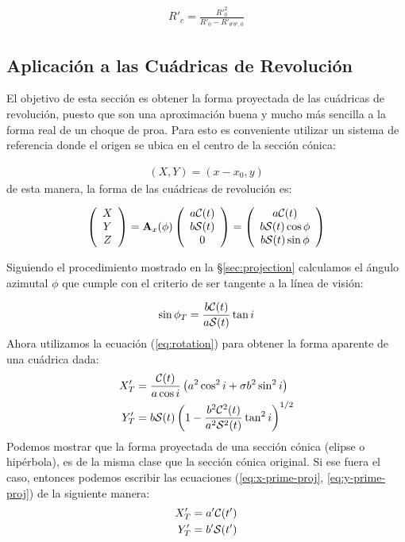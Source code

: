\begin{align}
  R'_c = \frac{R'^2_0}{R'_0 - R'_{\theta'\theta', 0}} \label{eq:Rc-prime}
\end{align}

\subsection{Aplicación a las Cuádricas de Revolución}
\label{sec:pi-lambda-quadric}
El objetivo de esta sección es obtener la forma proyectada de las cuádricas de revolución, puesto que son una aproximación buena y mucho más sencilla a la forma real de un choque de proa. Para esto es conveniente utilizar un sistema de referencia donde el origen se ubica en el centro de la sección cónica:

\begin{align}
  (X, Y) = (x-x_0, y)
\end{align}
de esta manera, la forma de las cuádricas de revolución es:

\begin{align}
  \left(
  \begin{array}{c}
    X \\ Y \\ Z
  \end{array}
  \right) = \mathbf{A}_x(\phi)\left(
  \begin{array}{c}
    a\mathcal{C}(t) \\ b\mathcal{S}(t) \\ 0
  \end{array}
  \right)
  = \left(
    \begin{array}{c}
      a\mathcal{C}(t) \\
      b\mathcal{S}(t)\cos\phi \\
      b\mathcal{S}(t)\sin\phi
    \end{array}
    \right)
\end{align}

Siguiendo el procedimiento mostrado en la \S \ref{sec:projection} calculamos el ángulo azimutal $\phi$ que cumple con el criterio de ser tangente a la línea de visión: 

\begin{align}
  \sin\phi_T = \frac{b\mathcal{C}(t)}{a\mathcal{S}(t)}\tan i 
\end{align}
Ahora utilizamos la ecuación (\ref{eq:rotation}) para obtener la forma aparente de una cuádrica dada:
\begin{align}
  X'_T &= \frac{\mathcal{C}(t)}{a\cos i}\left(a^2\cos^2 i + \sigma b^2\sin^2 i\right)
  \label{eq:x-prime-proj}\\
  Y'_T &= b\mathcal{S}(t)\left(1 - \frac{b^2\mathcal{C}^2(t)}{a^2\mathcal{S}^2(t)}\tan^2 i\right)^{1/2}
  \label{eq:y-prime-proj}
\end{align}
Podemos mostrar que la forma proyectada de una sección cónica (elipse o hipérbola), es de la misma clase que la sección cónica original. Si ese fuera el caso, entonces podemos escribir las ecuaciones (\ref{eq:x-prime-proj}, \ref{eq:y-prime-proj}) de la siguiente manera:
\begin{align}
  X'_T &= a'\mathcal{C}(t') \label{eq:xtprime}\\
  Y'_T &= b'\mathcal{S}(t') \label{eq:ytprime}
\end{align}

